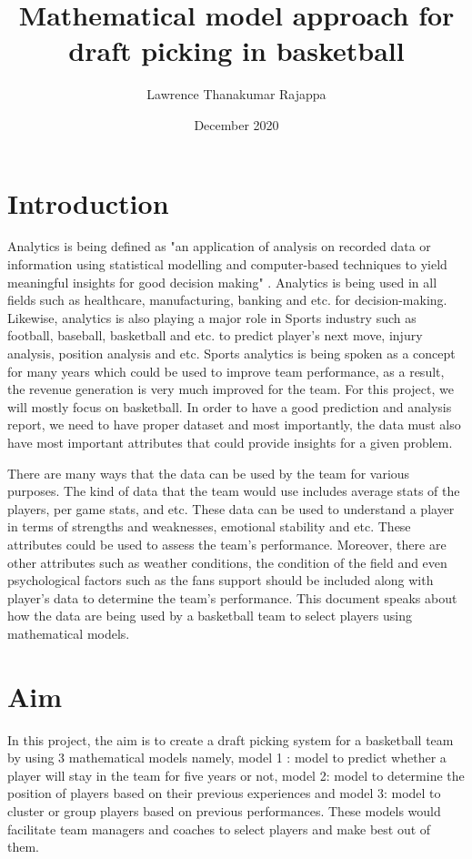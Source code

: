 \documentclass[format=sigconf]{acmart}
\title{Mathematical model approach for draft picking in basketball}
\author{Lawrence Thanakumar Rajappa}
\affiliation{\institution{IDA Linköping University}}
\date{December 2020}
\begin{document}
\maketitle
\pagestyle{plain} %

\section{Introduction}
Analytics is being defined as "an application of analysis on recorded data or information using statistical modelling and 
computer-based techniques to yield meaningful insights for good decision making" \cite{jennette2018drawing}.
Analytics is being used in all fields such as healthcare, manufacturing, banking and etc. for decision-making. Likewise, 
analytics is also playing a major role in Sports industry such as football, baseball, basketball and etc. to predict player's 
next move, injury analysis, position analysis and etc. Sports analytics is being spoken as a concept for many years which 
could be used to improve team performance, as a result, the revenue generation is very much improved for the team. For this 
project, we will mostly focus on basketball. In order to have a good prediction and analysis report, we need to have proper
dataset and most importantly, the data must also have most important attributes that could provide insights for a given problem.

There are many ways that the data can be used by the team for various purposes. The kind of data that the team would use includes
average stats of the players, per game stats, and etc. These data can be used to understand a player in terms of strengths and 
weaknesses, emotional stability and etc. These attributes could be used to assess the team's performance. Moreover, there are other 
attributes such as weather conditions, the condition of the field and even psychological factors such as the fans support should be
included along with player's data to determine the team's performance. This document speaks about how the data are being used by
a basketball team to select players using mathematical models.

\section{Aim}
In this project, the aim is to create a draft picking system for a basketball team by using 3 mathematical models namely, model 1 : model
to predict whether a player will stay in the team for five years or not, model 2: model to determine the position of players 
based on their previous experiences and model 3: model to cluster or group players based on previous performances. These models
would facilitate team managers and coaches to select players and make best out of them.
\end{document}
